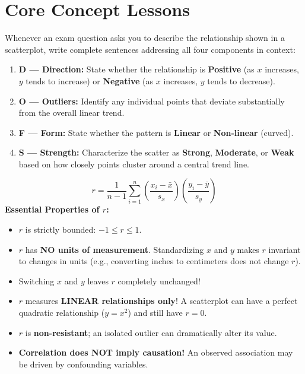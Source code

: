 \section{Core Concept Lessons}

\begin{lessonbox}
Whenever an exam question asks you to describe the relationship shown in a scatterplot, write complete sentences addressing all four components in context:
\begin{enumerate}[leftmargin=1.5em]
  \item \textbf{D --- Direction:} State whether the relationship is \textbf{Positive} (as $x$ increases, $y$ tends to increase) or \textbf{Negative} (as $x$ increases, $y$ tends to decrease).
  \item \textbf{O --- Outliers:} Identify any individual points that deviate substantially from the overall linear trend.
  \item \textbf{F --- Form:} State whether the pattern is \textbf{Linear} or \textbf{Non-linear} (curved).
  \item \textbf{S --- Strength:} Characterize the scatter as \textbf{Strong}, \textbf{Moderate}, or \textbf{Weak} based on how closely points cluster around a central trend line.
\end{enumerate}
\end{lessonbox}

\begin{lessonbox}
\begin{equation}
  r = \frac{1}{n-1}\sum_{i=1}^n \left(\frac{x_i - \bar{x}}{s_x}\right)\left(\frac{y_i - \bar{y}}{s_y}\right)
\end{equation}
\textbf{Essential Properties of $r$:}
\begin{itemize}[leftmargin=1.2em]
  \item $r$ is strictly bounded: $-1 \le r \le 1$.
  \item $r$ has \textbf{NO units of measurement}. Standardizing $x$ and $y$ makes $r$ invariant to changes in units (e.g., converting inches to centimeters does not change $r$).
  \item Switching $x$ and $y$ leaves $r$ completely unchanged!
  \item $r$ measures \textbf{LINEAR relationships only}! A scatterplot can have a perfect quadratic relationship ($y = x^2$) and still have $r = 0$.
  \item $r$ is \textbf{non-resistant}; an isolated outlier can dramatically alter its value.
  \item \textbf{Correlation does NOT imply causation!} An observed association may be driven by confounding variables.
\end{itemize}
\end{lessonbox}

